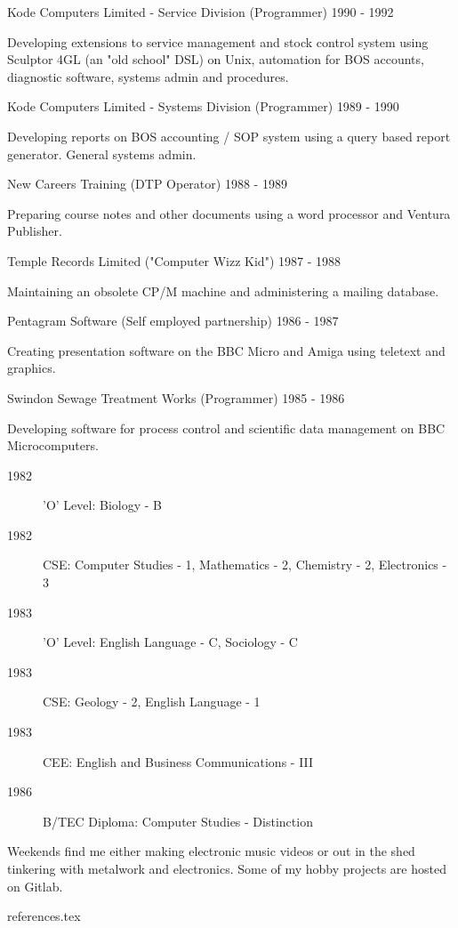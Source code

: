\jobHeading
    {Kode Computers Limited - Service Division (Programmer)}
    {1990 - 1992}

Developing extensions to service management
and stock control system using
Sculptor 4GL (an "old school" DSL) on Unix,
automation for BOS accounts,
diagnostic software,
systems admin and procedures.

\jobHeading
    {Kode Computers Limited - Systems Division (Programmer)}
    {1989 - 1990}

Developing reports on BOS accounting / SOP system
using a query based report generator. General systems admin.

\jobHeading
    {New Careers Training (DTP Operator)}
    {1988 - 1989}

Preparing course notes and other documents
using a word processor and Ventura Publisher.

\jobHeading
    {Temple Records Limited ("Computer Wizz Kid")}
    {1987 - 1988}

Maintaining an obsolete CP/M machine and administering a mailing database.

\jobHeading
    {Pentagram Software (Self employed partnership)}
    {1986 - 1987}

Creating presentation software on the BBC Micro and Amiga
using teletext and graphics.

\jobHeading
    {Swindon Sewage Treatment Works (Programmer)}
    {1985 - 1986}

Developing software for process control and scientific data management
on BBC Microcomputers.



\begin{description}
    \item[1982] 'O' Level: Biology - B
    \item[1982] CSE: Computer Studies - 1, Mathematics - 2,
        Chemistry - 2, Electronics - 3
    \item[1983] 'O' Level: English Language - C, Sociology - C
    \item[1983] CSE: Geology - 2, English Language - 1
    \item[1983] CEE: English and Business Communications - III
\end{description}


\begin{description}
    \item[1986] B/TEC Diploma: Computer Studies - Distinction
\end{description}


Weekends find me either making electronic music videos
or out in the shed tinkering with metalwork and electronics.
Some of my hobby projects are hosted on Gitlab.


 {references.tex}
